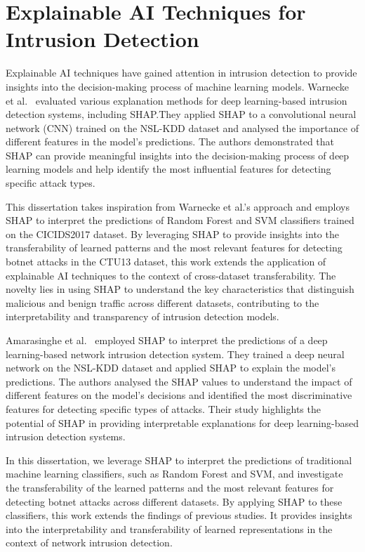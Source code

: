 \section{Explainable AI Techniques for Intrusion Detection}

Explainable AI techniques have gained attention in intrusion detection to provide insights into the decision-making process of machine learning models. Warnecke et al.~\cite{warnecke2020evaluating} evaluated various explanation methods for deep learning-based intrusion detection systems, including SHAP.\@ They applied SHAP to a convolutional neural network (CNN) trained on the NSL-KDD dataset and analysed the importance of different features in the model’s predictions. The authors demonstrated that SHAP can provide meaningful insights into the decision-making process of deep learning models and help identify the most influential features for detecting specific attack types.

This dissertation takes inspiration from Warnecke et al.’s approach and employs SHAP to interpret the predictions of Random Forest and SVM classifiers trained on the CICIDS2017 dataset. By leveraging SHAP to provide insights into the transferability of learned patterns and the most relevant features for detecting botnet attacks in the CTU13 dataset, this work extends the application of explainable AI techniques to the context of cross-dataset transferability. The novelty lies in using SHAP to understand the key characteristics that distinguish malicious and benign traffic across different datasets, contributing to the interpretability and transparency of intrusion detection models.

Amarasinghe et al.~\cite{amarasinghe2018toward} employed SHAP to interpret the predictions of a deep learning-based network intrusion detection system. They trained a deep neural network on the NSL-KDD dataset and applied SHAP to explain the model’s predictions. The authors analysed the SHAP values to understand the impact of different features on the model’s decisions and identified the most discriminative features for detecting specific types of attacks. Their study highlights the potential of SHAP in providing interpretable explanations for deep learning-based intrusion detection systems.

In this dissertation, we leverage SHAP to interpret the predictions of traditional machine learning classifiers, such as Random Forest and SVM, and investigate the transferability of the learned patterns and the most relevant features for detecting botnet attacks across different datasets. By applying SHAP to these classifiers, this work extends the findings of previous studies. It provides insights into the interpretability and transferability of learned representations in the context of network intrusion detection.

